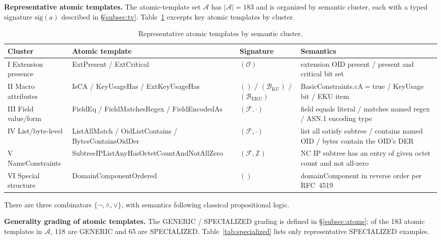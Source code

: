 \textbf{Representative atomic templates.} The atomic-template set $\mathcal{A}$
has $|\mathcal{A}|=183$ and is organized by semantic cluster, each with a typed
signature $\mathrm{sig}(a)$ described in \S\ref{subsec:tv}. Table~\ref{tab:atoms} excerpts
key atomic templates by cluster.

\begin{table}[tb]
\centering
\footnotesize
\caption{Representative atomic templates by semantic cluster.}
\label{tab:atoms}
\begin{tabularx}{\textwidth}{@{}l p{4.2cm} l X@{}}
\toprule
Cluster & Atomic template & Signature & Semantics \\
\midrule
I Extension presence & ExtPresent / ExtCritical &
  $(\mathcal{O})$ & extension OID present / present and critical bit set \\
II Macro attributes & IsCA / KeyUsageHas /
  ExtKeyUsageHas & $()$ / $(\mathcal{B}_{\mathrm{KU}})$ /
  $(\mathcal{B}_{\mathrm{EKU}})$ & BasicConstraints.cA$=$true / KeyUsage bit /
  EKU item \\
III Field value/form & FieldEq / FieldMatchesRegex /
  FieldEncodedAs & $(\mathcal{F}, \cdot)$ & field equals literal /
  matches named regex / ASN.1 encoding type \\
IV List/byte-level & ListAllMatch / OidListContains /
  BytesContainsOidDer & $(\mathcal{F}, \cdot)$ & list all satisfy
  subtree / contains named OID / bytes contain the OID's DER \\
V NameConstraints & SubtreeIPListAny\-HasOctetCount\-AndNotAllZero &
  $(\mathcal{F}, \mathbb{Z})$ & NC IP subtree has an entry of given octet count
  and not all-zero \\
VI Special structure & DomainComponentOrdered & $()$ &
  domainComponent in reverse order per RFC~4519 \\
\bottomrule
\end{tabularx}
\end{table}

There are three combinators $\{\neg, \wedge, \vee\}$, with semantics following
classical propositional logic.

\textbf{Generality grading of atomic templates.} The GENERIC / SPECIALIZED
grading is defined in \S\ref{subsec:atoms}; of the 183 atomic templates in
$\mathcal{A}$, 118 are GENERIC and 65 are
SPECIALIZED. Table~\ref{tab:specialized} lists only representative SPECIALIZED
examples.

